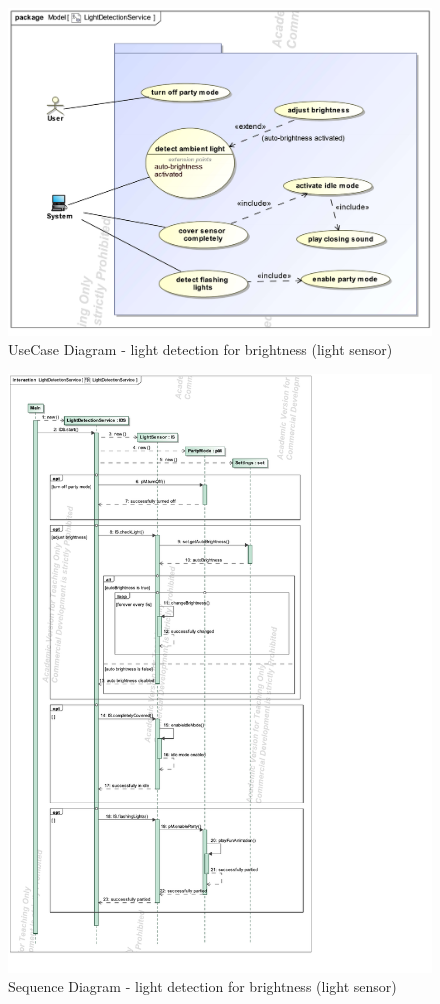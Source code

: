 \documentclass{article}
\begin{document}
		\begin{figure}[h!]
			\centering
			\captionsetup{labelformat=empty}
			\caption{UseCase Diagram - light detection for brightness (light sensor)}
		    	\includegraphics[width=\textwidth, angle=0]{Marc/light/LightDetectionServiceUseCase.pdf}
		\end{figure}
		\clearpage
		\begin{figure}[h!]
			\centering
			\captionsetup{labelformat=empty}
			\caption{Sequence Diagram - light detection for brightness (light sensor)}
		    	\includegraphics[scale=0.78, angle=0]{Marc/light/LightDetectionServiceSequence.pdf}
		\end{figure}
\end{document}
